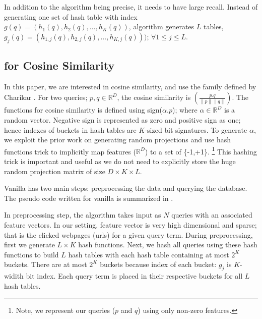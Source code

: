 In addition to the \lsh algorithm being precise, it needs to have large recall. 
Instead of generating one set of hash table with index $g(q)=(h_1(q),h_2(q),\dots,h_K(q))$, 
\lsh algorithm generates $L$ tables, $g_j(q)=(h_{1,j}(q),h_{2,j}(q),\dots,h_{K,j}(q)))$; $\forall 1 \leq j \leq  L$. 


\subsection{\lsh for Cosine Similarity}
\label{subsec:vlsh:cosine}
In this paper, we are interested in cosine similarity, and use the \lsh family defined by Charikar . 
For two queries; $p,q \in \mathbb{R}^D$, the cosine similarity is $\left( \frac{p.q}{ \| p \| \| q \| }\right)$. 
The \lsh functions for cosine similarity is defined using sign($\alpha.p$); where $\alpha \in \mathbb{R}^D$ is a random vector. 
Negative sign is represented as zero and positive sign as one; hence indexes of buckets in hash tables are $K$-sized bit signatures.  
To generate $\alpha$, we exploit the prior work on 
generating random projections \cite{Achlioptas03,LiH06} and 
use hash functions trick to implicitly map features ($\mathbb{R}^D$) to a set of \{-1,+1\}.
\footnote{Note, we represent our queries ($p$ and $q$) using only non-zero features.}  
This hashing trick is important and useful as we do not need to explicitly store the 
huge random projection matrix of size $D \times K \times L$.  


Vanilla \lsh has two main steps: preprocessing the data and querying the database.  
The pseudo code written for vanilla \lsh is summarized in . 

In preprocessing step, the algorithm takes input as $N$ queries with an associated feature vectors. In our setting, 
feature vector is very high dimensional and sparse; that is the clicked webpages (urls) for a given query term. 
During preprocessing, first we generate $L\times K$ hash functions. 
Next, we hash all queries using these hash functions to build $L$ hash tables 
with each hash table containing at most $2^K$ buckets. 
There are at most $2^K$ buckets because index of each bucket: $g_j$ is $K$-widith bit index. 
Each query term is placed in their respective buckets for all  $L$ hash tables.

